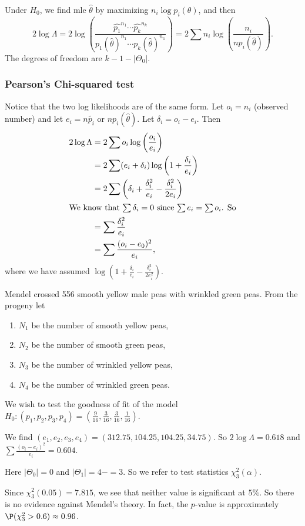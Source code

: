 \documentclass[a4paper]{article}
\begin{document}
Under $H_0$, we find mle $\hat{\theta}$ by maximizing $n_i \log p_i (\theta)$, and then
\[
  2\log \Lambda = 2\log \left(\frac{\hat{p_1}^{n_1}\cdots \hat{p_k}^{n_k}}{p_1(\hat{\theta})^{n_1}\cdots p_k (\hat{\theta})^{n_1}}\right) = 2\sum n_i \log \left(\frac{n_i}{np_i(\hat{\theta})}\right).\tag{2}
\]
The degrees of freedom are $k - 1 - |\Theta_0|$.

\subsubsection{Pearson's Chi-squared test}
Notice that the two log likelihoods are of the same form. Let $o_i = n_i$ (observed number) and let $e_i = n\tilde{p_i}$ or $np_i(\hat{\theta})$. Let $\delta_i = o_i - e_i$. Then
\begin{align*}
  2\log \Lambda &= 2\sum o_i \log \left(\frac{o_i}{e_i}\right)\\
  &= 2\sum (e_i + \delta_i) \log\left(1 + \frac{\delta_i}{e_i}\right)\\
  &= 2\sum \left(\delta_i + \frac{\delta_i^2}{e_i} - \frac{\delta_i^2}{2e_i}\right)\\
  \intertext{We know that $\sum \delta_i = 0$ since $\sum e_i = \sum o_i$. So}
  &= \sum \frac{\delta_i^2}{e_i}\\
  &= \sum\frac{(o_i - e_0)^2}{e_i},
\end{align*}
where we have assumed $\log\left(1 + \frac{\delta_i}{e_i} - \frac{\delta_i^2}{2e_i^2}\right)$.

\begin{eg}
  Mendel crossed 556 smooth yellow male peas with wrinkled green peas. From the progeny let
  \begin{enumerate}
    \item $N_1$ be the number of smooth yellow peas,
    \item $N_2$ be the number of smooth green peas,
    \item $N_3$ be the number of wrinkled yellow peas,
    \item $N_4$ be the number of wrinkled green peas.
  \end{enumerate}
  We wish to test the goodness of fit of the model $H_0: (p_1, p_2, p_3, p_4) = \left(\frac{9}{16}, \frac{3}{16}, \frac{3}{16}, \frac{1}{16}\right)$.

  We find $(e_1, e_2, e_3, e_4) = (312.75, 104.25, 104.25, 34.75)$. So $2\log \Lambda = 0.618$ and $\sum \frac{(o_i - e_i)^2}{e_i} = 0.604$.

  Here $|\Theta_0| = 0$ and $|\Theta_1| = 4 - = 3$. So we refer to test statistics $\chi_3^2(\alpha)$.

  Since $\chi_3^2(0.05) = 7.815$, we see that neither value is significant at $5\%$. So there is no evidence against Mendel's theory. In fact, the $p$-value is approximately $\P(\chi_3^2 > 0.6) \approx 0.96$.
\end{eg}
\end{document}

